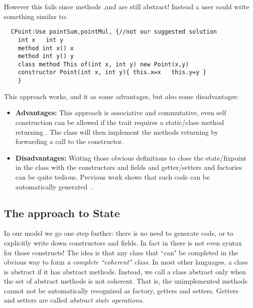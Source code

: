 \noindent However this fails since methods \Q@x@,\Q@y@ and \Q@of@ are still abstract!
Instead a user could write something similar to:

\begin{lstlisting}
  CPoint:Use pointSum,pointMul, {//not our suggested solution
    int x   int y
    method int x() x       
    method int y() y
    class method This of(int x, int y) new Point(x,y)
    constructor Point(int x, int y){ this.x=x   this.y=y }
    }
\end{lstlisting}

\noindent This approach works, and it as some advantages, but also
some disadvantages: 

\begin{itemize}

\item {\bf Advantages:} This approach is associative and commutative, even self construction
  can be allowed if the trait requires a static/class method
  returning \Q@This@. The class will then implement the methods returning \Q@This@
  by forwarding a call to the constructor.
  
\item {\bf Disadvantages:} Writing those obvious definitions to close
  the state/fixpoint in the class 
   with the constructors and fields and getter/setters and factories can be quite tedious.
   Previous work shows that such code can be automatically generated~\cite{wang2016classless}.

\end{itemize}

\subsection{The \name approach to State}

In our model we go one step further: there is no need to generate
code, or to explicitly write down constructors and fields. In fact in
\name there is not even syntax for those constructs!  The idea is that
any class that ``can" be completed in the obvious way to form \emph{a
  complete ``coherent" class}.  In most other languages, a class is
abstract if it has abstract methods.  Instead, we call a class
abstract only when the set of abstract methods is not coherent. That
is, the unimplemented methods cannot not be automatically recognized
as factory, getters and setters. Getters and setters are called
\emph{abstract state operations}.
  
